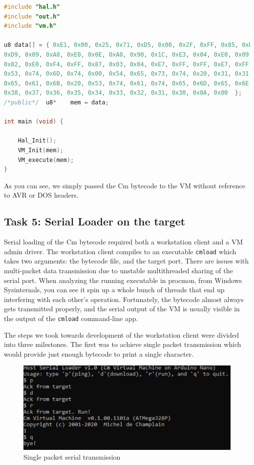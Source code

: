 \documentclass[11pt]{article}
\begin{document}
\begin{center}
    \begin{lstlisting}[language=C, columns=fixed, caption=admin\_avr\_test\_t11.c]
#include "hal.h"
#include "out.h"
#include "vm.h"

u8 data[] = { 0xE1, 0x00, 0x25, 0x71, 0xD5, 0x00, 0x2F, 0xFF, 0x85, 0xD5, 0x00, 0x44, 0xFF, 0x85,
0xD9, 0x09, 0xA8, 0xE0, 0x0E, 0xA0, 0x90, 0x1C, 0xE3, 0x04, 0xE0, 0x09, 0xA0, 0xB4, 0x00, 0xFF,
0x82, 0xE0, 0xF4, 0xFF, 0x87, 0x03, 0x04, 0xE7, 0xFF, 0xFF, 0xE7, 0xFF, 0xDB, 0x00, 0x54, 0x2E,
0x53, 0x74, 0x6D, 0x74, 0x00, 0x54, 0x65, 0x73, 0x74, 0x20, 0x31, 0x31, 0x3A, 0x20, 0x62, 0x72,
0x65, 0x61, 0x6B, 0x20, 0x53, 0x74, 0x61, 0x74, 0x65, 0x6D, 0x65, 0x6E, 0x74, 0x0A, 0x00, 0x39,
0x38, 0x37, 0x36, 0x35, 0x34, 0x33, 0x32, 0x31, 0x30, 0x0A, 0x00  };
/*public*/  u8*    mem = data;

int main (void) {
    
    Hal_Init();
    VM_Init(mem);
    VM_execute(mem);
}
    \end{lstlisting}
\end{center}

As you can see, we simply passed the Cm bytecode to the VM without reference to AVR or DOS headers.

\subsection{Task 5: Serial Loader on the target}

Serial loading of the Cm bytecode required both a workstation client and a VM admin driver.
The workstation client compiles to an executable \lstinline[columns=fixed]{cmload} which takes two arguments: the bytecode file, and the target port. 
There are issues with multi-packet data transmission due to unstable multithreaded sharing of the serial port.
When analyzing the running executable in procmon, from Windows Sysinternals, you can see it spin up a whole bunch of threads that end up interfering with each other's operation.
Fortunately, the bytecode almost always gets transmitted properly, and the serial output of the VM is usually visible in the output of the \lstinline[columns=fixed]{cmload} command-line app.

The steps we took towards development of the workstation client were divided into three milestones.
The first was to achieve single packet transmission which would provide just enough bytecode to print a single character.
\begin{figure}[h!]
    \includegraphics[width=\textwidth]{report/single_predefined_packet.PNG}
    \caption{Single packet serial transmission}
\end{figure}
\end{document}
